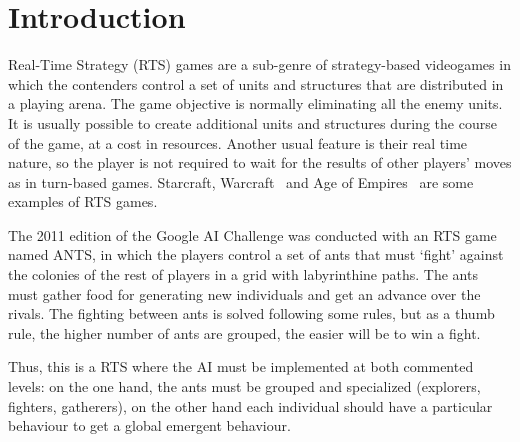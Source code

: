 \documentclass[runningheads]{llncs}
\begin{document}

\section{Introduction}

Real-Time Strategy (RTS) games are a sub-genre of strategy-based
videogames in which the contenders control a set of units and
structures that are distributed in a playing arena. The game objective
is normally eliminating all the enemy units. It is usually possible to
create additional units and structures during the course of the game,
at a cost in resources. Another usual feature is their real time
nature, so the player is not required to wait for the results of other
players' moves as in turn-based games. Starcraft\texttrademark,
Warcraft\texttrademark~ and Age of Empires\texttrademark~ are some
examples of RTS games.    

The 2011 edition of the Google AI Challenge \cite{webGAIC} %
was
conducted with an RTS game named ANTS, in which the players control a set
of ants that must `fight' against the colonies of the rest of players
in a grid with labyrinthine paths. The ants must gather food for
generating new individuals and get an advance over the rivals. The
fighting between ants is solved following some rules, but as a thumb
rule, the higher number of ants are grouped, the easier will be to win
a fight. 

Thus, this is a RTS where the AI must be implemented at both commented levels: on the one hand, the ants must be grouped and specialized (explorers, fighters, gatherers), on the other hand each individual should have a particular behaviour to get a global emergent behaviour.
\end{document}
